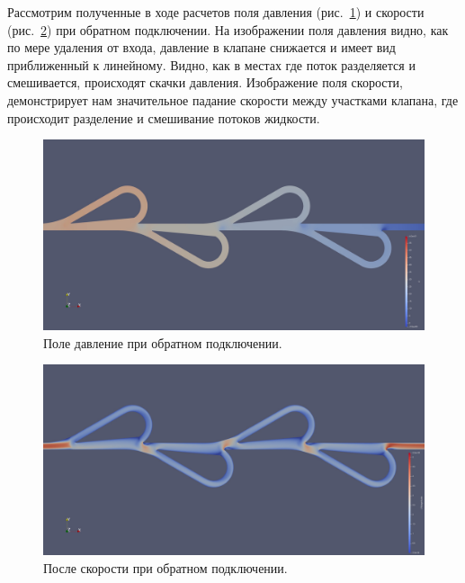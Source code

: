 \documentclass[14pt,a4paper]{article}
\begin{document}
        Рассмотрим полученные в ходе расчетов поля давления (рис.~\ref{fig:PFieldsReverse}) и скорости (рис.~\ref{fig:UFieldsReverse}) при обратном подключении. На изображении поля давления видно, как по мере удаления от входа, давление в клапане снижается и имеет вид приближенный к линейному. Видно, как в местах где поток разделяется и смешивается, происходят скачки давления. Изображение поля скорости, демонстрирует нам значительное падание скорости между участками клапана, где происходит разделение и смешивание потоков жидкости.
        
        \begin{figure}[H]
            \centering
            \includegraphics[width = 1\linewidth]{PFieldsReverse}
            \caption{Поле давление при обратном подключении.}
            \label{fig:PFieldsReverse}
        \end{figure}
        
        \begin{figure}[H]
            \centering
            \includegraphics[width = 1\linewidth]{UFieldsReverse}
            \caption{После скорости при обратном подключении.}
            \label{fig:UFieldsReverse}
        \end{figure}
            
\end{document}
